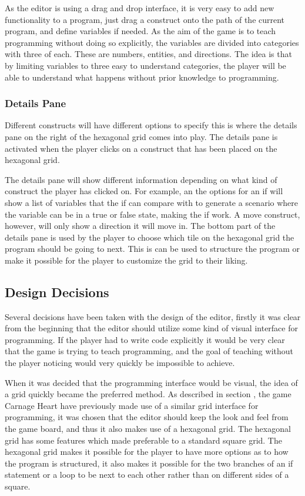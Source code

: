 As the editor is using a drag and drop interface, it is very easy to add new functionality to a program, just drag a construct onto the path of the current program, and define variables if needed. As the aim of the game is to teach programming without doing so explicitly, the variables are divided into categories with three of each. These are numbers, entities, and directions. The idea is that by limiting variables to three easy to understand categories, the player will be able to understand what happens without prior knowledge to programming.

\subsubsection*{Details Pane}
Different constructs will have different options to specify this is where the details pane on the right of the hexagonal grid comes into play. The details pane is activated when the player clicks on a construct that has been placed on the hexagonal grid.\newline

The details pane will show different information depending on what kind of construct the player has clicked on. For example, an the options for an if will show a list of variables that the if can compare with to generate a scenario where the variable can be in a true or false state, making the if work. A move construct, however, will only show a direction it will move in. The bottom part of the details pane is used by the player to choose which tile on the hexagonal grid the program should be going to next. This is can be used to structure the program or make it possible for the player to customize the grid to their liking.

\subsection{Design Decisions}
Several decisions have been taken with the design of the editor, firstly it was clear from the beginning that the editor should utilize some kind of visual interface for programming. If the player had to write code explicitly it would be very clear that the game is trying to teach programming, and the goal of teaching without the player noticing would very quickly be impossible to achieve.\newline

When it was decided that the programming interface would be visual, the idea of a grid quickly became the preferred method. As described in section , the game Carnage Heart have previously made use of a similar grid interface for programming, it was chosen that the editor should keep the look and feel from the game board, and thus it also makes use of a hexagonal grid. The hexagonal grid has some features which made preferable to a standard square grid. The hexagonal grid makes it possible for the player to have more options as to how the program is structured, it also makes it possible for the two branches of an if statement or a loop to be next to each other rather than on different sides of a square.\newline

